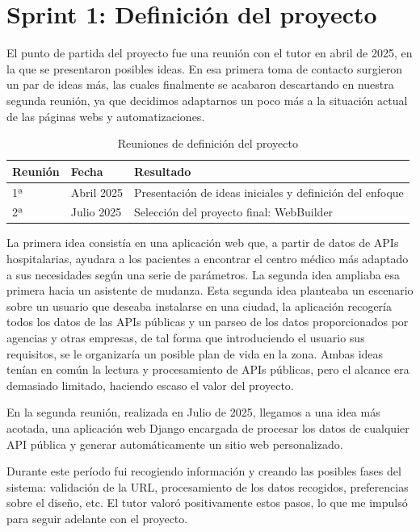 \section{Sprint 1: Definición del proyecto}
\label{sec:definicion-proyecto}

El punto de partida del proyecto fue una reunión con el tutor en abril de 2025, en la que se presentaron posibles ideas.
En esa primera toma de contacto surgieron un par de ideas más, las cuales finalmente se acabaron descartando en nuestra segunda reunión,
ya que decidimos adaptarnos un poco más a la situación actual de las páginas webs y automatizaciones.

\begin{table}[H]
    \centering
    \begin{tabular}{|l|l|p{8cm}|}
        \hline
        \textbf{Reunión} & \textbf{Fecha} & \textbf{Resultado} \\
        \hline
        1ª & Abril 2025 & Presentación de ideas iniciales y definición del enfoque \\
        \hline
        2ª & Julio 2025 & Selección del proyecto final: WebBuilder \\
        \hline
    \end{tabular}
    \caption{Reuniones de definición del proyecto}
    \label{tab:reuniones-definicion}
\end{table}

La primera idea consistía en una aplicación web que, a partir de datos de APIs hospitalarias, ayudara a los pacientes a encontrar el centro 
médico más adaptado a sus necesidades según una serie de parámetros. 
La segunda idea ampliaba esa primera hacia un asistente de mudanza. Esta segunda idea planteaba un escenario sobre un usuario que deseaba instalarse en una ciudad, la aplicación
recogería todos los datos de las APIs públicas y un parseo de los datos proporcionados por agencias y otras empresas, de tal forma que 
introduciendo el usuario sus requisitos, se le organizaría un posible plan de vida en la zona.
Ambas ideas tenían en común la lectura y procesamiento de APIs públicas, pero el alcance era demasiado limitado, haciendo escaso el valor del 
proyecto. 

En la segunda reunión, realizada en Julio de 2025, llegamos a una idea más acotada, una aplicación web Django encargada de procesar los datos
de cualquier API pública y generar automáticamente un sitio web personalizado.

Durante este período fui recogiendo información y creando las posibles fases del sistema:
validación de la URL, procesamiento de los datos recogidos, preferencias sobre el diseño, etc. El tutor valoró positivamente estos pasos, lo que me impulsó para seguir adelante con el proyecto.

